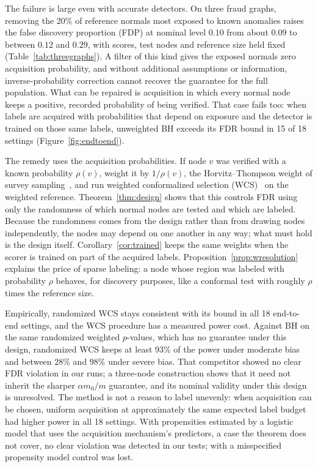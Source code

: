 \documentclass[twoside]{article}
\begin{document}
The failure is large even with accurate detectors. On three fraud graphs, removing the 20\% of reference normals most exposed to known anomalies raises the false discovery proportion (FDP) at nominal level $0.10$ from about $0.09$ to between $0.12$ and $0.29$, with scores, test nodes and reference size held fixed (Table~\ref{tab:threegraphs}). A filter of this kind gives the exposed normals zero acquisition probability, and without additional assumptions or information, inverse-probability correction cannot recover the guarantee for the full population. What can be repaired is acquisition in which every normal node keeps a positive, recorded probability of being verified. That case fails too: when labels are acquired with probabilities that depend on exposure and the detector is trained on those same labels, unweighted BH exceeds its FDR bound in 15 of 18 settings (Figure~\ref{fig:endtoend}).

The remedy uses the acquisition probabilities. If node $v$ was verified with a known probability $\rho(v)$, weight it by $1/\rho(v)$, the Horvitz--Thompson weight of survey sampling~\citep{horvitz1952generalization}, and run weighted conformalized selection (WCS)~\citep{jin2026weighted} on the weighted reference. Theorem~\ref{thm:design} shows that this controls FDR using only the randomness of which normal nodes are tested and which are labeled. Because the randomness comes from the design rather than from drawing nodes independently, the nodes may depend on one another in any way; what must hold is the design itself. Corollary~\ref{cor:trained} keeps the same weights when the scorer is trained on part of the acquired labels. Proposition~\ref{prop:wresolution} explains the price of sparse labeling: a node whose region was labeled with probability $\rho$ behaves, for discovery purposes, like a conformal test with roughly $\rho$ times the reference size.

Empirically, randomized WCS stays consistent with its bound in all 18 end-to-end settings, and the WCS procedure has a measured power cost. Against BH on the same randomized weighted $p$-values, which has no guarantee under this design, randomized WCS keeps at least $93\%$ of the power under moderate bias and between $28\%$ and $98\%$ under severe bias. That competitor showed no clear FDR violation in our runs; a three-node construction shows that it need not inherit the sharper $\alpha m_0/m$ guarantee, and its nominal validity under this design is unresolved. The method is not a reason to label unevenly: when acquisition can be chosen, uniform acquisition at approximately the same expected label budget had higher power in all 18 settings. With propensities estimated by a logistic model that uses the acquisition mechanism's predictors, a case the theorem does not cover, no clear violation was detected in our tests; with a misspecified propensity model control was lost.
\end{document}
